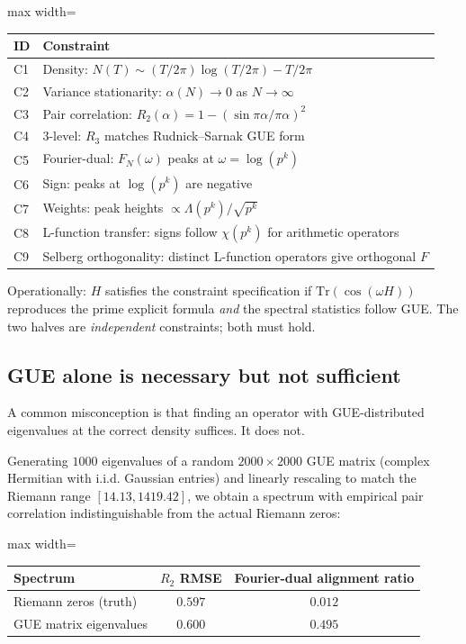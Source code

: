 \documentclass[11pt,a4paper]{article}
\theoremstyle{plain}
\theoremstyle{definition}
\theoremstyle{remark}
\begin{document}
\begin{center}
\begin{adjustbox}{max width=\linewidth}\begin{tabular}{ll}
\toprule
ID & Constraint \\
\midrule
C1 & Density: $N(T) \sim (T/2\pi)\log(T/2\pi) - T/2\pi$ \\
C2 & Variance stationarity: $\alpha(N) \to 0$ as $N \to \infty$ \\
C3 & Pair correlation: $R_2(\alpha) = 1 - (\sin \pi\alpha/\pi\alpha)^2$ \\
C4 & 3-level: $R_3$ matches Rudnick--Sarnak GUE form \\
C5 & Fourier-dual: $F_N(\omega)$ peaks at $\omega = \log(p^k)$ \\
C6 & Sign: peaks at $\log(p^k)$ are negative \\
C7 & Weights: peak heights $\propto \Lambda(p^k)/\sqrt{p^k}$ \\
C8 & L-function transfer: signs follow $\chi(p^k)$ for arithmetic operators \\
C9 & Selberg orthogonality: distinct L-function operators give orthogonal $F$ \\
\bottomrule
\end{tabular}\end{adjustbox}
\end{center}

Operationally: $H$ satisfies the constraint specification if
$\mathrm{Tr}(\cos(\omega H))$ reproduces the prime explicit formula
\emph{and} the spectral statistics follow GUE. The two halves are
\emph{independent} constraints; both must hold.

\subsection{GUE alone is necessary but not sufficient}
\label{sec:hp-gue-not-enough}

A common misconception is that finding an operator with GUE-distributed
eigenvalues at the correct density suffices. It does not.

Generating $1000$ eigenvalues of a random $2000 \times 2000$ GUE
matrix (complex Hermitian with i.i.d. Gaussian entries) and linearly
rescaling to match the Riemann range $[14.13, 1419.42]$, we obtain a
spectrum with empirical pair correlation indistinguishable from the
actual Riemann zeros:

\begin{center}
\begin{adjustbox}{max width=\linewidth}\begin{tabular}{lcc}
\toprule
Spectrum & $R_2$ RMSE & Fourier-dual alignment ratio \\
\midrule
Riemann zeros (truth) & $0.597$ & $0.012$ \\
GUE matrix eigenvalues & $0.600$ & $0.495$ \\
\bottomrule
\end{tabular}\end{adjustbox}
\end{center}
\end{document}
